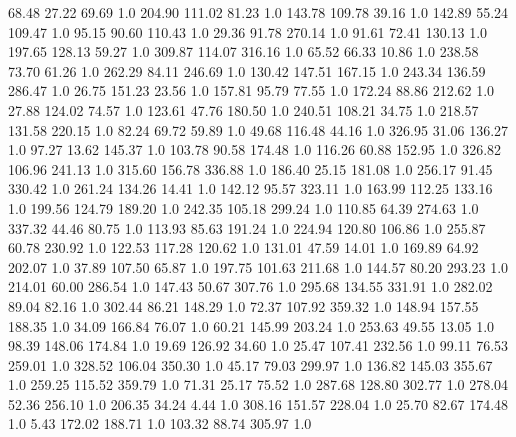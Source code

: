      68.48     27.22     69.69  1.0
    204.90    111.02     81.23  1.0
    143.78    109.78     39.16  1.0
    142.89     55.24    109.47  1.0
     95.15     90.60    110.43  1.0
     29.36     91.78    270.14  1.0
     91.61     72.41    130.13  1.0
    197.65    128.13     59.27  1.0
    309.87    114.07    316.16  1.0
     65.52     66.33     10.86  1.0
    238.58     73.70     61.26  1.0
    262.29     84.11    246.69  1.0
    130.42    147.51    167.15  1.0
    243.34    136.59    286.47  1.0
     26.75    151.23     23.56  1.0
    157.81     95.79     77.55  1.0
    172.24     88.86    212.62  1.0
     27.88    124.02     74.57  1.0
    123.61     47.76    180.50  1.0
    240.51    108.21     34.75  1.0
    218.57    131.58    220.15  1.0
     82.24     69.72     59.89  1.0
     49.68    116.48     44.16  1.0
    326.95     31.06    136.27  1.0
     97.27     13.62    145.37  1.0
    103.78     90.58    174.48  1.0
    116.26     60.88    152.95  1.0
    326.82    106.96    241.13  1.0
    315.60    156.78    336.88  1.0
    186.40     25.15    181.08  1.0
    256.17     91.45    330.42  1.0
    261.24    134.26     14.41  1.0
    142.12     95.57    323.11  1.0
    163.99    112.25    133.16  1.0
    199.56    124.79    189.20  1.0
    242.35    105.18    299.24  1.0
    110.85     64.39    274.63  1.0
    337.32     44.46     80.75  1.0
    113.93     85.63    191.24  1.0
    224.94    120.80    106.86  1.0
    255.87     60.78    230.92  1.0
    122.53    117.28    120.62  1.0
    131.01     47.59     14.01  1.0
    169.89     64.92    202.07  1.0
     37.89    107.50     65.87  1.0
    197.75    101.63    211.68  1.0
    144.57     80.20    293.23  1.0
    214.01     60.00    286.54  1.0
    147.43     50.67    307.76  1.0
    295.68    134.55    331.91  1.0
    282.02     89.04     82.16  1.0
    302.44     86.21    148.29  1.0
     72.37    107.92    359.32  1.0
    148.94    157.55    188.35  1.0
     34.09    166.84     76.07  1.0
     60.21    145.99    203.24  1.0
    253.63     49.55     13.05  1.0
     98.39    148.06    174.84  1.0
     19.69    126.92     34.60  1.0
     25.47    107.41    232.56  1.0
     99.11     76.53    259.01  1.0
    328.52    106.04    350.30  1.0
     45.17     79.03    299.97  1.0
    136.82    145.03    355.67  1.0
    259.25    115.52    359.79  1.0
     71.31     25.17     75.52  1.0
    287.68    128.80    302.77  1.0
    278.04     52.36    256.10  1.0
    206.35     34.24      4.44  1.0
    308.16    151.57    228.04  1.0
     25.70     82.67    174.48  1.0
      5.43    172.02    188.71  1.0
    103.32     88.74    305.97  1.0

